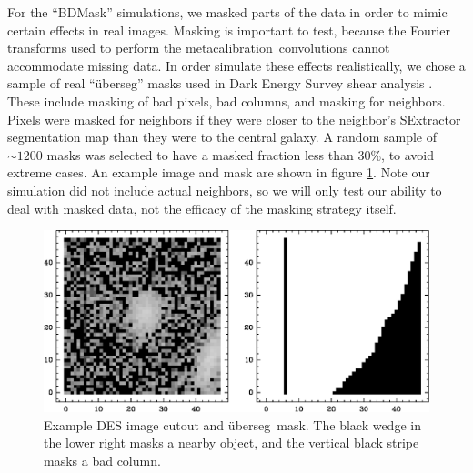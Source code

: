 \documentclass[usegraphicx,usenatbib]{mn2e}
\newcommand{\uberseg}{{\"u}berseg}
\newcommand{\mcal}{metacalibration}
\begin{document}
For the ``BDMask'' simulations, we masked parts of the data in order to mimic
certain effects in real images. Masking is important to test, because the
Fourier transforms used to perform the \mcal\ convolutions cannot accommodate
missing data.  In order simulate these effects realistically, we chose a sample
of real ``\uberseg'' masks used in Dark Energy Survey shear analysis
\citep{DESSVShear}.  These include masking of bad pixels, bad columns, and
masking for neighbors.  Pixels were masked for neighbors if they were closer to
the neighbor's SExtractor \citep{Bertin96} segmentation map than they were to
the central galaxy.  A random sample of $\sim 1200$ masks was selected to have
a masked fraction less than 30\%, to avoid extreme cases.  An example image and
mask are shown in figure \ref{fig:mask}.  Note our simulation did not include
actual neighbors, so we will only test our ability to deal with masked data,
not the efficacy of the masking strategy itself.

\begin{figure}
    \centering
    \includegraphics[scale=0.45]{DES0508-5540-uberseg-013916.eps}

    \caption{Example DES image cutout and \uberseg\ mask.  The black wedge in
the lower right masks a nearby object, and the vertical black stripe masks a
bad column. }

\label{fig:mask}
\end{figure}
\end{document}
